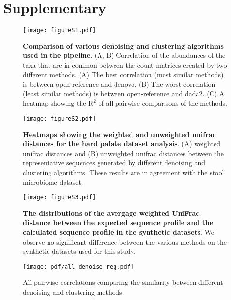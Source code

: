 
\newpage
\section*{Supplementary}

  \renewcommand{\thefigure}{S\arabic{figure}}
  \setcounter{figure}{0}

  \begin{figure}[h]
  \centering
  \texttt{[image: figureS1.pdf]}
  \caption{
    \textbf{Comparison of various denoising and clustering algorithms used in the pipeline}.
    (A, B) Correlation of the abundances of the taxa that are in common between the count matrices created by two different methods.
    (A) The best correlation (most similar methods) is between open-reference and denovo.
    (B) The worst correlation (least similar methods) is between open-reference and dada2.
    (C) A heatmap showing the $\mathrm{R}^2$ of all pairwise comparisons of the methods.
  }
  \label{fig:figureS1}
\end{figure}

  \begin{figure}[h]
    \centering
    \texttt{[image: figureS2.pdf]}
    \caption{
      \textbf{Heatmaps showing the weighted and unweighted unifrac distances for the hard palate dataset analysis}.
      (A) weighted unifrac distances and (B) unweighted unifrac distances between the representative sequences generated by different denoising and clustering algorithms.
      These results are in agreement with the stool microbiome dataset.
    }
    \label{fig:figureS2}
  \end{figure}

  \begin{figure}[h]
    \centering
    \texttt{[image: figureS3.pdf]}
    \caption{
      \textbf{The distributions of the avergage weighted UniFrac distance between the expected sequence profile and the calculated sequence profile in the synthetic datasets}.
      We observe no significant difference between the various methods on the synthetic datasets used for this study.
    }
    \label{fig:figureS3}
  \end{figure}

  \begin{figure}[h]
    \centering
    \texttt{[image: pdf/all\_denoise\_reg.pdf]}
    \caption*{All pairwise correlations comparing the similarity between different denoising and clustering methods}
    \label{fig:figureS4}
  \end{figure}

